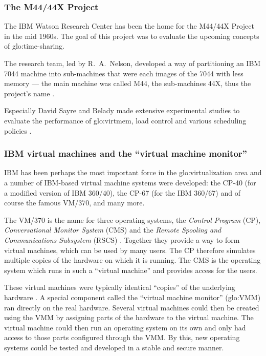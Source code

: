 \subsubsection{The M44/44X Project}

The IBM Watson  Research Center has been the home  for the M44/44X Project
in the  mid 1960s. The goal of  this project was to  evaluate the upcoming
concepts of  \gls{glo:time-sharing}.

The research team, led by R.~A.~Nelson, developed a way of partitioning an
IBM 7044 machine into sub-machines that  were each images of the 7044 with
less memory  --- the  main machine was  called M44, the  sub-machines 44X,
thus the project's name \cite{virtualization-overview}.

Especially David  Sayre and Belady made extensive  experimental studies to
evaluate the  performance of  \gls{glo:virtmem}, load control  and various
scheduling policies \cite{Belady66,denning81}.

\subsubsection{IBM virtual machines and the ``virtual machine monitor''}

IBM    has   been   perhaps    the   most    important   force    in   the
\gls{glo:virtualization} area  and a  number of IBM-based  virtual machine
systems were developed: the CP-40  (for a modified version of IBM 360/40),
the CP-67 (for  the IBM 360/67) and of course the  famous VM/370, and many
more.

The  VM/370 is  the name  for three  operating systems,  the \emph{Control
  Program}  (CP),  \emph{Conversational  Monitor  System}  (CMS)  and  the
\emph{Remote Spooling and Communications Subsystem} (RSCS) \cite{creasy81}.
Together they provide a way to form virtual machines, which can be used by
many users. The CP therefore  simulates multiple copies of the hardware on
which it is running.  The CMS is the operating system which runs in such a
``virtual machine'' and provides access for the users.

These  virtual  machines  were   typically  identical  ``copies''  of  the
underlying  hardware  \cite{popek74}.   A  special  component  called  the
``virtual  machine  monitor'' (\gls{glo:VMM})  ran  directly  on the  real
hardware.  Several virtual machines could then be created using the VMM by
assigning  parts of  the  hardware  to the  virtual  machine. The  virtual
machine could then run an operating  system on its own and only had access
to those parts configured through the VMM.  By this, new operating systems
could be tested and developed in a stable and secure manner.

